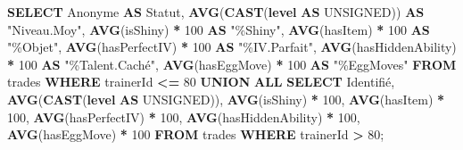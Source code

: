 \documentclass[mstat,12pt]{unswthesis}
\newenvironment{Shaded}{\begin{snugshade}}{\end{snugshade}}
\newcommand{\DecValTok}[1]{\textcolor[rgb]{0.00,0.00,0.81}{#1}}
\newcommand{\FunctionTok}[1]{\textcolor[rgb]{0.13,0.29,0.53}{\textbf{#1}}}
\newcommand{\KeywordTok}[1]{\textcolor[rgb]{0.13,0.29,0.53}{\textbf{#1}}}
\newcommand{\NormalTok}[1]{#1}
\newcommand{\OperatorTok}[1]{\textcolor[rgb]{0.81,0.36,0.00}{\textbf{#1}}}
\newcommand{\OtherTok}[1]{\textcolor[rgb]{0.56,0.35,0.01}{#1}}
\newcommand{\StringTok}[1]{\textcolor[rgb]{0.31,0.60,0.02}{#1}}
\begin{document}
\begin{Shaded}
\begin{Highlighting}[]
\KeywordTok{SELECT} \StringTok{\textquotesingle{}Anonyme\textquotesingle{}} \KeywordTok{AS}\NormalTok{ Statut,}
\FunctionTok{AVG}\NormalTok{(}\FunctionTok{CAST}\NormalTok{(}\KeywordTok{level} \KeywordTok{AS}\NormalTok{ UNSIGNED))}
\KeywordTok{AS} \OtherTok{"Niveau.Moy"}\NormalTok{, }\FunctionTok{AVG}\NormalTok{(isShiny) }
\OperatorTok{*} \DecValTok{100} \KeywordTok{AS} \OtherTok{"\%Shiny"}\NormalTok{, }\FunctionTok{AVG}\NormalTok{(hasItem) }
\OperatorTok{*} \DecValTok{100} \KeywordTok{AS} \OtherTok{"\%Objet"}\NormalTok{, }\FunctionTok{AVG}\NormalTok{(hasPerfectIV) }
\OperatorTok{*} \DecValTok{100} \KeywordTok{AS} \OtherTok{"\%IV.Parfait"}\NormalTok{, }\FunctionTok{AVG}\NormalTok{(hasHiddenAbility) }
\OperatorTok{*} \DecValTok{100} \KeywordTok{AS} \OtherTok{"\%Talent.Caché"}\NormalTok{, }\FunctionTok{AVG}\NormalTok{(hasEggMove) }
\OperatorTok{*} \DecValTok{100} \KeywordTok{AS} \OtherTok{"\%EggMoves"} 
\KeywordTok{FROM}\NormalTok{ trades }\KeywordTok{WHERE}\NormalTok{ trainerId }\OperatorTok{\textless{}=} \DecValTok{80} 
\KeywordTok{UNION} \KeywordTok{ALL} 
\KeywordTok{SELECT} \StringTok{\textquotesingle{}Identifié\textquotesingle{}}\NormalTok{,}
\FunctionTok{AVG}\NormalTok{(}\FunctionTok{CAST}\NormalTok{(}\KeywordTok{level} \KeywordTok{AS}\NormalTok{ UNSIGNED)),}
\FunctionTok{AVG}\NormalTok{(isShiny) }
\OperatorTok{*} \DecValTok{100}\NormalTok{, }\FunctionTok{AVG}\NormalTok{(hasItem) }
\OperatorTok{*} \DecValTok{100}\NormalTok{, }\FunctionTok{AVG}\NormalTok{(hasPerfectIV) }
\OperatorTok{*} \DecValTok{100}\NormalTok{, }\FunctionTok{AVG}\NormalTok{(hasHiddenAbility) }
\OperatorTok{*} \DecValTok{100}\NormalTok{, }\FunctionTok{AVG}\NormalTok{(hasEggMove) }\OperatorTok{*} \DecValTok{100} 
\KeywordTok{FROM}\NormalTok{ trades }\KeywordTok{WHERE}\NormalTok{ trainerId }\OperatorTok{\textgreater{}} \DecValTok{80}\NormalTok{;}
\end{Highlighting}
\end{Shaded}
\end{document}
